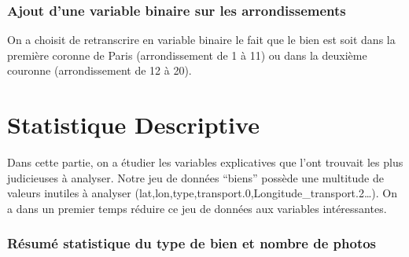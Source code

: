 \documentclass[french,]{article}
\newenvironment{Shaded}{\begin{snugshade}}{\end{snugshade}}
\newcommand{\CommentTok}[1]{\textcolor[rgb]{0.56,0.35,0.01}{\textit{#1}}}
\newcommand{\ControlFlowTok}[1]{\textcolor[rgb]{0.13,0.29,0.53}{\textbf{#1}}}
\newcommand{\DataTypeTok}[1]{\textcolor[rgb]{0.13,0.29,0.53}{#1}}
\newcommand{\DecValTok}[1]{\textcolor[rgb]{0.00,0.00,0.81}{#1}}
\newcommand{\KeywordTok}[1]{\textcolor[rgb]{0.13,0.29,0.53}{\textbf{#1}}}
\newcommand{\NormalTok}[1]{#1}
\newcommand{\OperatorTok}[1]{\textcolor[rgb]{0.81,0.36,0.00}{\textbf{#1}}}
\begin{document}
\hypertarget{ajout-dune-variable-binaire-sur-les-arrondissements}{%
\subsubsection{Ajout d'une variable binaire sur les
arrondissements}\label{ajout-dune-variable-binaire-sur-les-arrondissements}}

On a choisit de retranscrire en variable binaire le fait que le bien est
soit dans la première coronne de Paris (arrondissement de 1 à 11) ou
dans la deuxième couronne (arrondissement de 12 à 20).

\begin{Shaded}
\end{Shaded}

\hypertarget{statistique-descriptive}{%
\section{Statistique Descriptive}\label{statistique-descriptive}}

Dans cette partie, on a étudier les variables explicatives que l'ont
trouvait les plus judicieuses à analyser. Notre jeu de données ``biens''
possède une multitude de valeurs inutiles à analyser
(lat,lon,type,transport.0,Longitude\_transport.2\ldots{}). On a dans un
premier temps réduire ce jeu de données aux variables intéressantes.

\hypertarget{ruxe9sumuxe9-statistique-du-type-de-bien-et-nombre-de-photos}{%
\subsubsection{Résumé statistique du type de bien et nombre de
photos}\label{ruxe9sumuxe9-statistique-du-type-de-bien-et-nombre-de-photos}}
\end{document}
